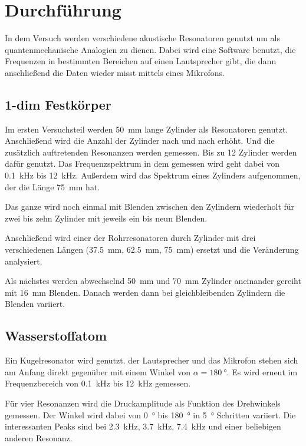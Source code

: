\section{Durchführung}
\label{sec:Durchführung}

In dem Versuch werden verschiedene akustische Resonatoren genutzt um als quantenmechanische Analogien zu dienen.
Dabei wird eine Software benutzt, die Frequenzen in bestimmten Bereichen auf einen Lautsprecher gibt, die dann anschließend die Daten wieder misst mittels eines Mikrofons. 

\subsection{1-dim Festkörper}

Im ersten Versuchsteil werden \SI{50}{\milli\meter} lange Zylinder als Resonatoren genutzt. Anschließend wird die Anzahl der Zylinder nach und nach erhöht. Und die zusätzlich auftretenden Resonanzen werden gemessen. 
Bis zu \num{12} Zylinder werden dafür genutzt.
Das Frequenzspektrum in dem gemessen wird geht dabei von \SI{0.1}{\kilo\hertz} bis \SI{12}{\kilo\hertz}. 
Außerdem wird das Spektrum eines Zylinders aufgenommen, der die Länge \SI{75}{\milli\metre} hat.

Das ganze wird noch einmal mit Blenden zwischen den Zylindern wiederholt für zwei bis zehn Zylinder mit jeweils ein bis neun Blenden. 

Anschließend wird einer der Rohrresonatoren durch Zylinder mit drei verschiedenen Längen (\SI{37.5}{\milli\meter}, \SI{62.5}{\milli\metre}, \SI{75}{\milli\metre}) ersetzt und die Veränderung analysiert. 

Als nächstes werden abwechselnd \SI{50}{\milli\metre} und \SI{70}{\milli\metre} Zylinder aneinander gereiht mit \SI{16}{\milli\meter} Blenden. 
Danach werden dann bei gleichbleibenden Zylindern die Blenden variiert. 

\subsection{Wasserstoffatom}

Ein Kugelresonator wird genutzt. der Lautsprecher und das Mikrofon stehen sich am Anfang direkt gegenüber mit einem Winkel von $\alpha = \SI{180}{\degree}$. 
Es wird erneut im Frequenzbereich von \SI{0.1}{\kilo\hertz} bis \SI{12}{\kilo\hertz} gemessen. 

Für vier Resonanzen wird die Druckamplitude als Funktion des Drehwinkels gemessen. Der Winkel wird dabei von \SI{0}{\degree} bis \SI{180}{\degree} in \SI{5}{\degree} Schritten variiert. Die interessanten Peaks sind bei \SI{2.3}{\kilo\hertz}, \SI{3.7}{\kilo\hertz}, \SI{7.4}{\kilo\hertz} und einer beliebigen anderen Resonanz.

